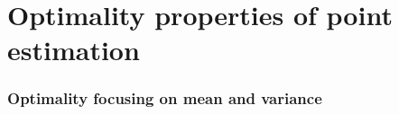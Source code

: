 

\part*{Optimality properties of point estimation}%

\section{Optimality focusing on mean and variance}


